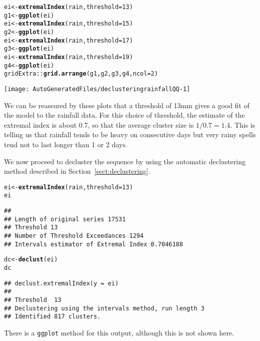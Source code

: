 \documentclass[10pt]{article}\usepackage[]{graphicx}\usepackage[]{color}
\makeatletter
\def\maxwidth{ %
  \ifdim\Gin@nat@width>\linewidth
    \linewidth
  \else
    \Gin@nat@width
  \fi
}
\newcommand{\hlnum}[1]{\textcolor[rgb]{0.686,0.059,0.569}{#1}}%
\newcommand{\hlopt}[1]{\textcolor[rgb]{0,0,0}{#1}}%
\newcommand{\hlstd}[1]{\textcolor[rgb]{0.345,0.345,0.345}{#1}}%
\newcommand{\hlkwb}[1]{\textcolor[rgb]{0.69,0.353,0.396}{#1}}%
\newcommand{\hlkwc}[1]{\textcolor[rgb]{0.333,0.667,0.333}{#1}}%
\newcommand{\hlkwd}[1]{\textcolor[rgb]{0.737,0.353,0.396}{\textbf{#1}}}%
\newenvironment{kframe}{%
 \def\at@end@of@kframe{}%
 \ifinner\ifhmode%
  \def\at@end@of@kframe{\end{minipage}}%
  \begin{minipage}{\columnwidth}%
 \fi\fi%
 \def\FrameCommand##1{\hskip\@totalleftmargin \hskip-\fboxsep
 \colorbox{shadecolor}{##1}\hskip-\fboxsep
     \hskip-\linewidth \hskip-\@totalleftmargin \hskip\columnwidth}%
 \MakeFramed {\advance\hsize-\width
   \@totalleftmargin\z@ \linewidth\hsize
   \@setminipage}}%
 {\par\unskip\endMakeFramed%
 \at@end@of@kframe}
\newenvironment{knitrout}{}{} %
\makeatother
\begin{document}
\begin{knitrout}
\color{fgcolor}\begin{kframe}
\begin{alltt}
\hlstd{ei} \hlkwb{<-} \hlkwd{extremalIndex}\hlstd{(rain,}\hlkwc{threshold}\hlstd{=}\hlnum{13}\hlstd{)}
\hlstd{g1} \hlkwb{<-} \hlkwd{ggplot}\hlstd{(ei)}
\hlstd{ei} \hlkwb{<-} \hlkwd{extremalIndex}\hlstd{(rain,}\hlkwc{threshold}\hlstd{=}\hlnum{15}\hlstd{)}
\hlstd{g2} \hlkwb{<-} \hlkwd{ggplot}\hlstd{(ei)}
\hlstd{ei} \hlkwb{<-} \hlkwd{extremalIndex}\hlstd{(rain,}\hlkwc{threshold}\hlstd{=}\hlnum{17}\hlstd{)}
\hlstd{g3} \hlkwb{<-} \hlkwd{ggplot}\hlstd{(ei)}
\hlstd{ei} \hlkwb{<-} \hlkwd{extremalIndex}\hlstd{(rain,}\hlkwc{threshold}\hlstd{=}\hlnum{19}\hlstd{)}
\hlstd{g4} \hlkwb{<-} \hlkwd{ggplot}\hlstd{(ei)}
\hlstd{gridExtra}\hlopt{::}\hlkwd{grid.arrange}\hlstd{(g1,g2,g3,g4,}\hlkwc{ncol}\hlstd{=}\hlnum{2}\hlstd{)}
\end{alltt}
\end{kframe}
\texttt{[image: AutoGeneratedFiles/declusteringrainfallQQ-1]} 

\end{knitrout}

We can be reassured by these plots that a threshold of 13mm gives a good fit of the model to the rainfall data.  For this choice of threshold, the estimate of the extremal index is about 0.7, so that the average cluster size is $1/0.7 = 1.4$.  This is telling us that rainfall tends to be heavy on consecutive days but very rainy spells tend not to last longer than 1 or 2 days.

We now proceed to decluster the sequence by using the automatic declustering method described in Section~\ref{sect:declustering}.

\begin{knitrout}
\color{fgcolor}\begin{kframe}
\begin{alltt}
\hlstd{ei} \hlkwb{<-} \hlkwd{extremalIndex}\hlstd{(rain,} \hlkwc{threshold}\hlstd{=}\hlnum{13}\hlstd{)}
\hlstd{ei}
\end{alltt}
\begin{verbatim}
## 
## Length of original series 17531 
## Threshold 13 
## Number of Threshold Exceedances 1294 
## Intervals estimator of Extremal Index 0.7046188
\end{verbatim}
\begin{alltt}
\hlstd{dc} \hlkwb{<-} \hlkwd{declust}\hlstd{(ei)}
\hlstd{dc}
\end{alltt}
\begin{verbatim}
## declust.extremalIndex(y = ei)
## 
## Threshold  13 
## Declustering using the intervals method, run length 3 
## Identified 817 clusters.
\end{verbatim}
\end{kframe}
\end{knitrout}
There is a {\tt ggplot} method for this output, although this is not shown here.
\end{document}
